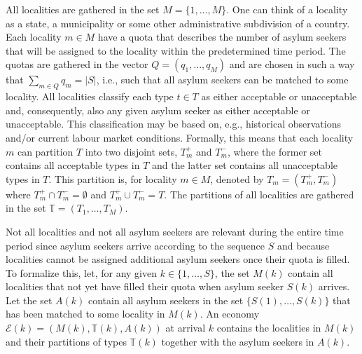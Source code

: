 \documentclass[12pt,fleqn]{article}
\begin{document}
All localities are gathered in the set $M=\{1,\ldots,M\}$. One can think of a locality as a state, a municipality or some other administrative subdivision of a country. Each locality $m\in M$ have a quota that describes the number of asylum seekers that will be assigned to the locality within the predetermined time period. The quotas are gathered in the vector $Q=(q_1,\ldots, q_M)$ and are chosen in such a way that $\sum_{m\in Q}q_m=|S|$, i.e., such that all asylum seekers can be matched to some locality. All localities classify each type $t\in T$ as either acceptable or unacceptable and, consequently, also any given asylum seeker as either acceptable or unacceptable. This classification may be based on, e.g., historical observations and/or current labour market conditions. Formally, this means that each locality $m$ can partition $T$ into two disjoint sets, $T^+_m$ and $T_m^-$, where the former set contains all acceptable types in $T$ and the latter set contains all unacceptable types in $T$. This partition is, for locality $m\in M$, denoted by $T_m=(T^+_m, T_m^-)$ where $T^+_m\cap T_m^-=\emptyset$ and $T^+_m\cup T_m^-=T$. The partitions of all localities are gathered in the set $\mathbb{T}=(T_1,\ldots,T_M)$.

Not all localities and not all asylum seekers are relevant during the entire time period since asylum seekers arrive according to the sequence $S$ and because localities cannot be assigned additional asylum seekers once their quota is filled. To formalize this, let, for any given $k\in \{1,\ldots,S\}$, the set $M(k)$ contain all localities that not yet have filled their quota when asylum seeker $S(k)$ arrives. Let the set $A(k)$ contain all asylum seekers in the set $\{S(1),\ldots,S(k)\}$ that has been matched to some locality in $M(k)$. An economy $\mathcal{E}(k)=(M(k),\mathbb{T}(k),A(k))$ at arrival $k$ contains the localities in $M(k)$ and their partitions of types $\mathbb{T}(k)$ together with the asylum seekers in $A(k)$.
\end{document}
